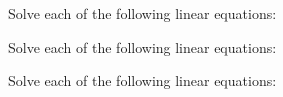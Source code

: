 \documentclass[12pt, a4paper, addpoints]{exam}
\newcommand{\bs}{\vspace{33mm}}
\newcommand{\verticalspace}{\vspace{11mm}} %
\begin{document}
\begin{questions}
\begin{multicols}{3}
\begin{parts}
\end{parts}
\end{multicols}



\bs
\Large
\question Solve each of the following linear equations:
\begin{multicols}{2} %
\end{multicols}

\bs
\question Solve each of the following linear equations:
\begin{multicols}{2} %
\end{multicols}








\bs


\question Solve each of the following linear equations:
\begin{multicols}{2} %
\end{multicols}
\end{questions}
\end{document}
